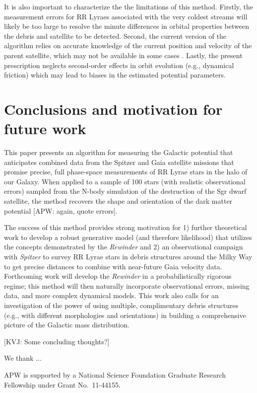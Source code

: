 \documentclass{emulateapj}
\begin{document}
It is also important to characterize the the limitations of this
method. Firstly, the measurement errors for RR Lyraes associated with
the very coldest streams \citep[e.g., the globular clusters Pal5 and
  GD1;][]{odenkirchen02,koposov10} will likely be too large to resolve
the minute differences in orbital properties between the debris and
satellite to be detected. Second, the current version of the algorithm
relies on accurate knowledge of the current position and velocity of
the parent satellite, which may not be available in some cases
\citep[for example, the Orphan Stream;][]{belokurov07}. Lastly, the
present prescription neglects second-order effects in orbit evolution (e.g.,
dynamical friction) which may lead to biases in
the estimated potential parameters.


\section{Conclusions and motivation for future work}
\label{sec:conclusion}

This paper presents an algorithm for measuring the Galactic potential
that anticipates combined data from the Spitzer and Gaia satellite
missions that promise precise, full phase-space measurements of RR
Lyrae stars in the halo of our Galaxy. When applied to a sample of 100
stars (with realistic observational errors) sampled from the
\cite{law10} N-body simulation of the destruction of the Sgr dwarf
satellite, the method recovers the shape and orientation of the dark
matter potential [APW: again, quote errors]. 

The success of this method provides strong motivation for 1) further theoretical work to develop a robust generative model (and therefore likelihood) that utilizes the concepts demonstrated by the \emph{Rewinder} and 2) an observational campaign with \emph{Spitzer} to survey RR Lyrae stars in debris structures around the Milky Way to get precise
distances to combine with near-future Gaia velocity data. Forthcoming work will develop the \emph{Rewinder} in a probabilistically rigorous regime; this method will then naturally incorporate observational errors, missing data, and more complex dynamical models. This work also calls for an investigation of the power of using multiple, complimentary debris structures (e.g., with different morphologies and orientations) in building a comprehensive picture of
the Galactic mass distribution.

[KVJ: Some concluding thoughts?]

\acknowledgments
We thank ...

APW is supported by a National Science Foundation Graduate Research
Fellowship under Grant No.\ 11-44155.



\end{document}
